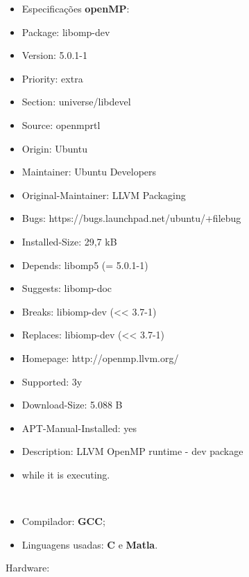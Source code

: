 \documentclass[letterpaper, 10 pt, conference]{ieeeconf}
\begin{document}
\begin{itemize}
    \item Especificações \textbf{openMP}:
    \item Package: libomp-dev
\item Version: 5.0.1-1
\item Priority: extra
\item Section: universe/libdevel
\item Source: openmprtl
\item Origin: Ubuntu
\item Maintainer: Ubuntu Developers
\item Original-Maintainer: LLVM Packaging 
\item Bugs: https://bugs.launchpad.net/ubuntu/+filebug
\item Installed-Size: 29,7 kB
\item Depends: libomp5 (= 5.0.1-1)
\item Suggests: libomp-doc
\item Breaks: libiomp-dev (<< 3.7-1)
\item Replaces: libiomp-dev (<< 3.7-1)
\item Homepage: http://openmp.llvm.org/
\item Supported: 3y
\item Download-Size: 5.088 B
\item APT-Manual-Installed: yes
\item Description: LLVM OpenMP runtime - dev package
 \item while it is executing.
\end{itemize}

\\
\begin{itemize}
    \item Compilador: \textbf{GCC}; 
\end{itemize}

\begin{itemize}
    \item Linguagens usadas: \textbf{C} e \textbf{Matla}.
\end{itemize}


Hardware:


\end{document}
